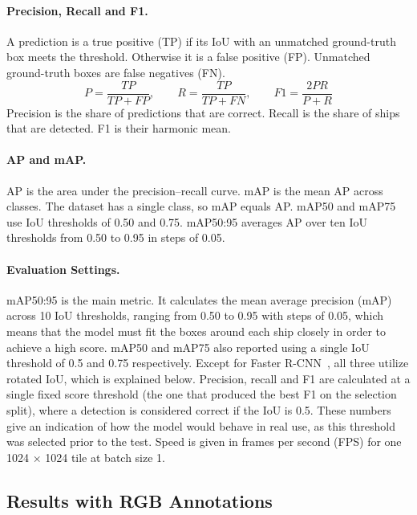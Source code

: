 \paragraph{Precision, Recall and F1.}
A prediction is a true positive (TP) if its IoU with an unmatched
ground-truth box meets the threshold. Otherwise it is a false positive
(FP). Unmatched ground-truth boxes are false negatives (FN).\\
\begin{equation}
P = \frac{TP}{TP+FP}, \qquad
R = \frac{TP}{TP+FN}, \qquad
F1 = \frac{2PR}{P+R}
\end{equation}
Precision is the share of predictions that are correct. Recall is the
share of ships that are detected. F1 is their harmonic mean.\\

\paragraph{AP and mAP.}
AP is the area under the precision--recall curve. mAP is the mean AP
across classes. The dataset has a single class, so mAP equals AP.
mAP50 and mAP75 use IoU thresholds of 0.50 and 0.75. mAP50:95 averages
AP over ten IoU thresholds from 0.50 to 0.95 in steps of 0.05.\\

\paragraph{Evaluation Settings.}
mAP50:95 is the main metric. It calculates the mean average precision (mAP) across 10 IoU thresholds, ranging from 0.50 to 0.95 with steps of 0.05, which means that the model must fit the boxes around each ship closely in order to achieve a high score. mAP50 and mAP75 also reported using a single IoU threshold of 0.5 and 0.75 respectively. Except for Faster R-CNN~\cite{7485869}, all three utilize rotated IoU, which is explained below. Precision, recall and F1 are calculated at a single fixed score threshold (the one that produced the best F1 on the selection split), where a detection is considered correct if the IoU is 0.5. These numbers give an indication of how the model would behave in real use, as this threshold was selected prior to the test. Speed is given in frames per second (FPS) for one 1024 × 1024 tile at batch size 1.

\subsection{Results with RGB Annotations}


